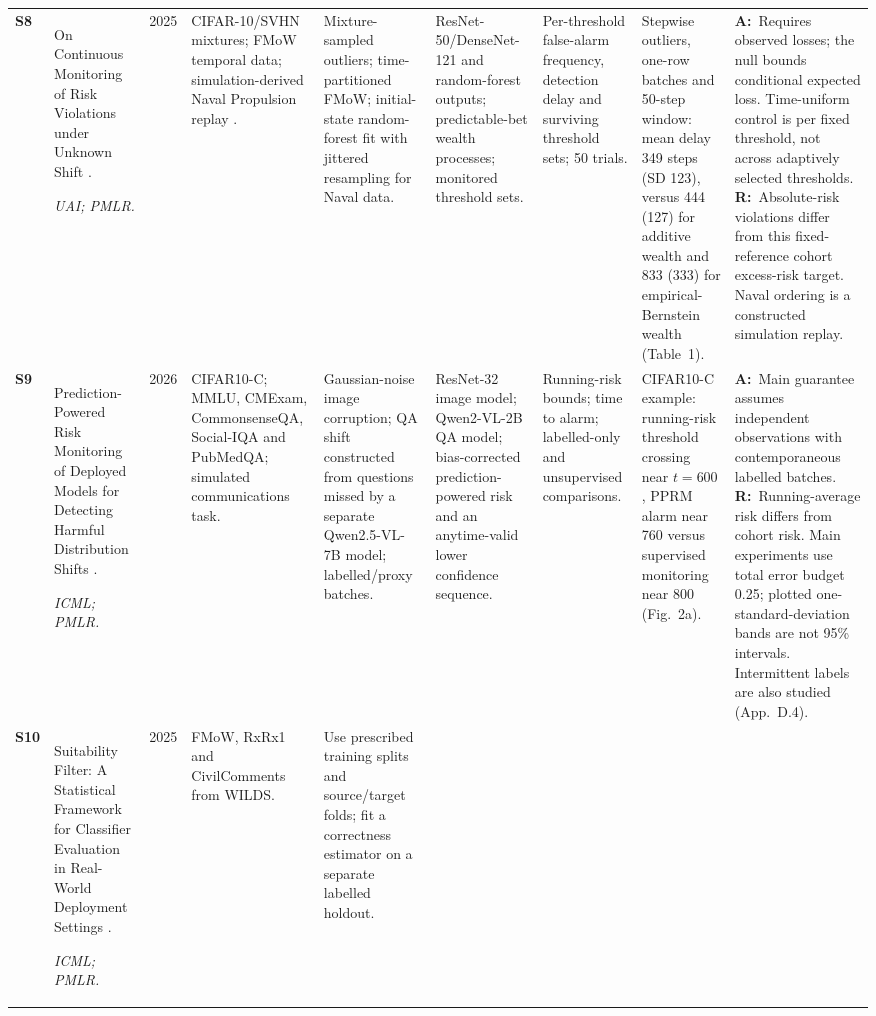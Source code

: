\documentclass[11pt,a4paper]{article}
\newcommand{\A}{\textbf{A:}\ }
\newcommand{\R}{\textbf{R:}\ }
\begin{document}
\begin{landscape}
\begin{longtable}{L{0.65cm}L{4.0cm}L{0.85cm}L{2.9cm}L{2.8cm}L{2.8cm}L{2.4cm}L{3.0cm}L{4.2cm}}
\addlinespace[5pt]
\textbf{S8} &
On Continuous Monitoring of Risk Violations under Unknown Shift \cite{timans}.
\par\emph{UAI; PMLR.} &
2025 &
CIFAR-10/SVHN mixtures; FMoW temporal data; simulation-derived Naval Propulsion replay \cite{navaldata}. &
Mixture-sampled outliers; time-partitioned FMoW; initial-state random-forest fit with jittered resampling for Naval data. &
ResNet-50/DenseNet-121 and random-forest outputs; predictable-bet wealth processes; monitored threshold sets. &
Per-threshold false-alarm frequency, detection delay and surviving threshold sets; 50 trials. &
Stepwise outliers, one-row batches and 50-step window: mean delay 349 steps (SD 123), versus 444 (127) for additive wealth and 833 (333) for empirical-Bernstein wealth (Table~1). &
\A Requires observed losses; the null bounds conditional expected loss. Time-uniform control is per fixed threshold, not across adaptively selected thresholds.
\R Absolute-risk violations differ from this fixed-reference cohort excess-risk target. Naval ordering is a constructed simulation replay.\\
\addlinespace[5pt]
\textbf{S9} &
Prediction-Powered Risk Monitoring of Deployed Models for Detecting Harmful Distribution Shifts \cite{pprm}.
\par\emph{ICML; PMLR.} &
2026 &
CIFAR10-C; MMLU, CMExam, CommonsenseQA, Social-IQA and PubMedQA; simulated communications task. &
Gaussian-noise image corruption; QA shift constructed from questions missed by a separate Qwen2.5-VL-7B model; labelled/proxy batches. &
ResNet-32 image model; Qwen2-VL-2B QA model; bias-corrected prediction-powered risk and an anytime-valid lower confidence sequence. &
Running-risk bounds; time to alarm; labelled-only and unsupervised comparisons. &
CIFAR10-C example: running-risk threshold crossing near $t=600$, PPRM alarm near 760 versus supervised monitoring near 800 (Fig.~2a). &
\A Main guarantee assumes independent observations with contemporaneous labelled batches.
\R Running-average risk differs from cohort risk. Main experiments use total error budget 0.25; plotted one-standard-deviation bands are not 95\% intervals. Intermittent labels are also studied (App.~D.4).\\
\addlinespace[5pt]
\textbf{S10} &
Suitability Filter: A Statistical Framework for Classifier Evaluation in Real-World Deployment Settings \cite{suitability}.
\par\emph{ICML; PMLR.} &
2025 &
FMoW, RxRx1 and CivilComments from WILDS. &
Use prescribed training splits and source/target folds; fit a correctness estimator on a separate labelled holdout. &

\end{longtable}
\end{landscape}
\end{document}

